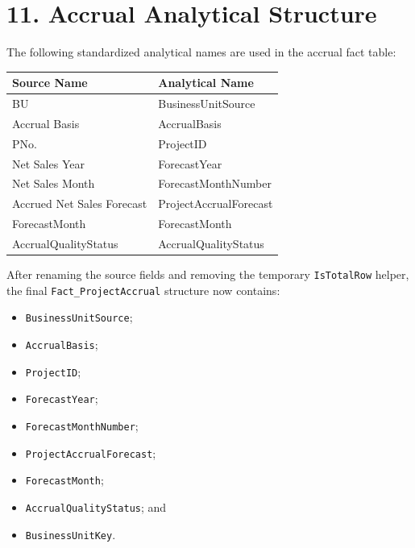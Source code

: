 \documentclass[11pt,a4paper]{article}
\begin{document}

\section{11. Accrual Analytical Structure}

The following standardized analytical names are used in the accrual fact
table:

\begin{tabularx}{\textwidth}{
    >{\ttfamily}p{5.6cm}
    >{\ttfamily}X
}

\toprule

Source Name
&
Analytical Name
\\

\midrule

BU
&
BusinessUnitSource
\\

Accrual Basis
&
AccrualBasis
\\

PNo.
&
ProjectID
\\

Net Sales Year
&
ForecastYear
\\

Net Sales Month
&
ForecastMonthNumber
\\

Accrued Net Sales Forecast
&
ProjectAccrualForecast
\\

ForecastMonth
&
ForecastMonth
\\

AccrualQualityStatus
&
AccrualQualityStatus
\\

\bottomrule

\end{tabularx}

After renaming the source fields and removing the temporary
\texttt{IsTotalRow} helper, the final \texttt{Fact\_ProjectAccrual}
structure now contains:

\begin{itemize}[leftmargin=7mm,itemsep=2pt]
    \item \texttt{BusinessUnitSource};
    \item \texttt{AccrualBasis};
    \item \texttt{ProjectID};
    \item \texttt{ForecastYear};
    \item \texttt{ForecastMonthNumber};
    \item \texttt{ProjectAccrualForecast};
    \item \texttt{ForecastMonth};
    \item \texttt{AccrualQualityStatus}; and
    \item \texttt{BusinessUnitKey}.
\end{itemize}
\end{document}
